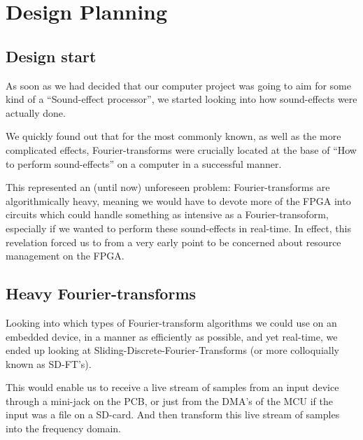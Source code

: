 \FloatBarrier
\section{Design Planning}\label{section:fpga-design}
\FloatBarrier
\subsection{Design start}

As soon as we had decided that our computer project was going to aim for some
kind of a ``Sound-effect processor'', we started looking into how sound-effects
were actually done.

We quickly found out that for the most commonly known, as well as the more
complicated effects, Fourier-transforms were crucially located at the base of
``How to perform sound-effects'' on a computer in a successful manner.

This represented an (until now) unforeseen problem: Fourier-transforms are
algorithmically heavy, meaning we would have to devote more of the FPGA into
circuits which could handle something as intensive as a Fourier-transoform,
especially if we wanted to perform these sound-effects in real-time. In effect,
this revelation forced us to from a very early point to be concerned about
resource management on the FPGA.

\FloatBarrier
\subsection{Heavy Fourier-transforms}

Looking into which types of Fourier-transform algorithms we could use on an
embedded device, in a manner as efficiently as possible, and yet real-time,
we ended up looking at 
Sliding-Discrete-Fourier-Transforms (or more colloquially known as SD-FT's).



This would enable us to receive a live stream of samples from an input device
through a mini-jack on the PCB, or just from the DMA's of the MCU if the input
was a file on a SD-card. And then transform this live stream of samples into
the frequency domain.

